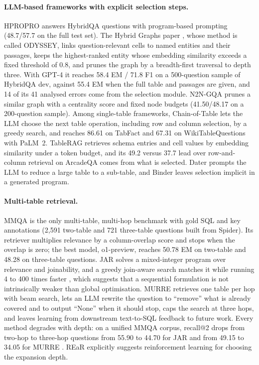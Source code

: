 \paragraph{LLM-based frameworks with explicit selection steps.} HPROPRO \citep{shi-etal-2024-exploring} answers HybridQA questions with program-based prompting (48.7/57.7 on the full test set). The Hybrid Graphs paper \citep{agarwal-etal-2025-hybrid}, whose method is called ODYSSEY, links question-relevant cells to named entities and their passages, keeps the highest-ranked entity whose embedding similarity exceeds a fixed threshold of 0.8, and prunes the graph by a breadth-first traversal to depth three. With GPT-4 it reaches 58.4 EM / 71.8 F1 on a 500-question sample of HybridQA dev, against 55.4 EM when the full table and passages are given, and 14 of its 41 analysed errors come from the selection module. N2N-GQA \citep{sharafath2026n2ngqa} prunes a similar graph with a centrality score and fixed node budgets (41.50/48.17 on a 200-question sample). Among single-table frameworks, Chain-of-Table \citep{wang2024chainoftable} lets the LLM choose the next table operation, including row and column selection, by a greedy search, and reaches 86.61 on TabFact and 67.31 on WikiTableQuestions with PaLM~2. TableRAG \citep{chen2024tablerag} retrieves schema entries and cell values by embedding similarity under a token budget, and its 49.2 versus 37.7 lead over row-and-column retrieval on ArcadeQA comes from what is selected. Dater \citep{ye2023dater} prompts the LLM to reduce a large table to a sub-table, and Binder \citep{cheng2023binder} leaves selection implicit in a generated program.

\paragraph{Multi-table retrieval.} MMQA \citep{wu2025mmqa} is the only multi-table, multi-hop benchmark with gold SQL and key annotations (2{,}591 two-table and 721 three-table questions built from Spider). Its retriever multiplies relevance by a column-overlap score and stops when the overlap is zero; the best model, o1-preview, reaches 50.78 EM on two-table and 48.28 on three-table questions. JAR \citep{chen2024jar} solves a mixed-integer program over relevance and joinability, and a greedy join-aware search matches it while running 4 to 400 times faster \citep{boutaleb2025exploring}, which suggests that a sequential formulation is not intrinsically weaker than global optimisation. MURRE \citep{zhang2025murre} retrieves one table per hop with beam search, lets an LLM rewrite the question to ``remove'' what is already covered and to output ``None'' when it should stop, caps the search at three hops, and leaves learning from downstream text-to-SQL feedback to future work. Every method degrades with depth: on a unified MMQA corpus, recall@2 drops from two-hop to three-hop questions from 55.90 to 44.70 for JAR and from 49.15 to 34.05 for MURRE \citep{ho2026pearl}. REaR \citep{agarwal2025rear} explicitly suggests reinforcement learning for choosing the expansion depth.

